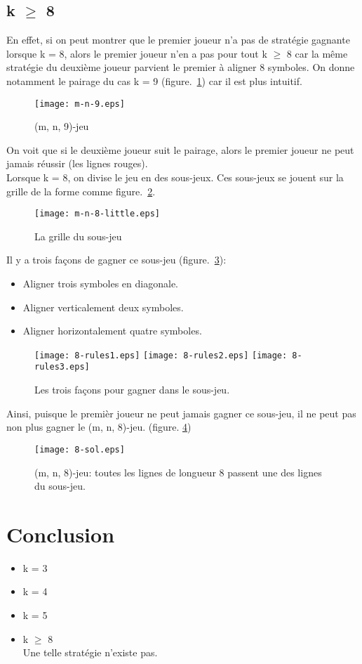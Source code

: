\documentclass[12pt, a4paper]{article}
\begin{document}
\subsection{k $\ge$ 8}
En effet, si on peut montrer que le premier joueur n'a pas de stratégie gagnante lorsque k = 8, alors le premier joueur n'en a pas pour tout k $\ge$ 8 car la même stratégie du deuxième joueur parvient le premier à aligner 8 symboles. On donne notamment le pairage du cas k = 9 \mbox{(figure. \ref{fig:m-n-9})} car il est plus intuitif.
\begin{figure}[h!]
    \centering
    \texttt{[image: m-n-9.eps]}
    \caption{(m, n, 9)-jeu}
    \label{fig:m-n-9}
\end{figure}
On voit que si le deuxième joueur suit le pairage, alors le premier joueur ne peut jamais réussir (les lignes rouges).\\
Lorsque k = 8, on divise le jeu en des sous-jeux. Ces sous-jeux se jouent sur la grille de la forme comme \mbox{figure. \ref{fig:sous-jeu}.}
\begin{figure}[h!]
    \centering
    \texttt{[image: m-n-8-little.eps]}
    \caption{La grille du sous-jeu}
    \label{fig:sous-jeu}
\end{figure}
Il y a trois façons de gagner ce sous-jeu \mbox{(figure. \ref{fig:regle}):}
\begin{itemize}
    \item Aligner trois symboles en diagonale.
    \item Aligner verticalement deux symboles.
    \item Aligner horizontalement quatre symboles.
\end{itemize}
\begin{figure}[h!]
    \centering
    \texttt{[image: 8-rules1.eps]}
    \texttt{[image: 8-rules2.eps]}
    \texttt{[image: 8-rules3.eps]}
    \caption{Les trois façons pour gagner dans le sous-jeu.}
    \label{fig:regle}
\end{figure}
Ainsi, puisque le premièr joueur ne peut jamais gagner ce sous-jeu, il ne peut pas non plus gagner le (m, n, 8)-jeu. (figure. \ref{fig:m-n-8})
\begin{figure}[h!]
    \centering
    \texttt{[image: 8-sol.eps]}
    \caption{(m, n, 8)-jeu:
    toutes les lignes de longueur 8 passent une des lignes du sous-jeu.}
    \label{fig:m-n-8}
\end{figure}
\section{Conclusion}

\begin{itemize}
    \item k = 3
    \item k = 4
    \item k = 5
    \item k $\ge$ 8\\
        Une telle stratégie n'existe pas.
\end{itemize}
\end{document}
